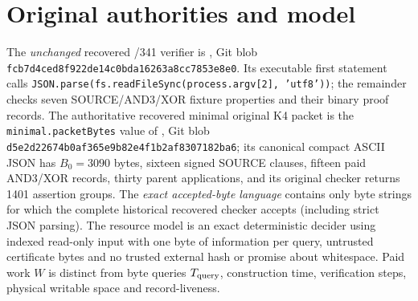 \documentclass[11pt]{article}
\begin{document}
\section*{Original authorities and model}
The \emph{unchanged} recovered /341 verifier is , Git blob \texttt{fcb7d4ced8f922de14c0bda16263a8cc7853e8e0}. Its executable first statement calls \texttt{JSON.parse(fs.readFileSync(process.argv[2], 'utf8'))}; the remainder checks seven SOURCE/AND3/XOR fixture properties and their binary proof records. The authoritative recovered minimal original K4 packet is the \texttt{minimal.packetBytes} value of , Git blob \texttt{d5e2d22674b0af365e9b82e4f1b2af8307182ba6}; its canonical compact ASCII JSON has $B_0=3090$ bytes, sixteen signed SOURCE clauses, fifteen paid AND3/XOR records, thirty parent applications, and its original checker returns 1401 assertion groups.
The \emph{exact accepted-byte language} contains only byte strings for which the complete historical recovered checker accepts (including strict JSON parsing). The resource model is an exact deterministic decider using indexed read-only input with one byte of information per query, untrusted certificate bytes and no trusted external hash or promise about whitespace. Paid work $W$ is distinct from byte queries $T_{\rm query}$, construction time, verification steps, physical writable space and record-liveness.
\end{document}
